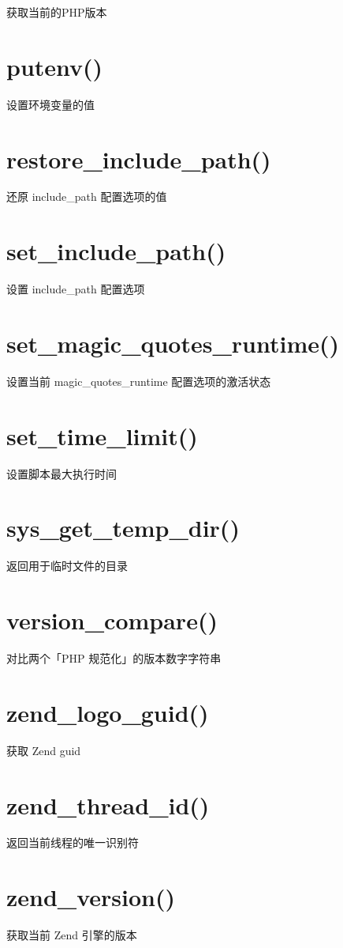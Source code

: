 获取当前的PHP版本
\section{putenv()}

设置环境变量的值
\section{restore\_include\_path()}

还原 include\_path 配置选项的值
\section{set\_include\_path()}

设置 include\_path 配置选项
\section{set\_magic\_quotes\_runtime()}

设置当前 magic\_quotes\_runtime 配置选项的激活状态
\section{set\_time\_limit()}

设置脚本最大执行时间
\section{sys\_get\_temp\_dir()}

返回用于临时文件的目录
\section{version\_compare()}

对比两个「PHP 规范化」的版本数字字符串
\section{zend\_logo\_guid()}

获取 Zend guid
\section{zend\_thread\_id()}

返回当前线程的唯一识别符
\section{zend\_version()}

获取当前 Zend 引擎的版本
































